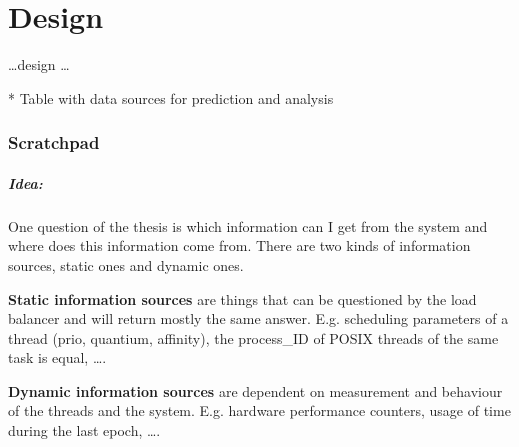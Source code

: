 \chapter{Design}
\label{sec:design}



\ldots design \ldots




* Table with data sources for prediction and analysis


\subsection{Scratchpad}
\paragraph{Idea:}
One question of the thesis is which information can I get
from the system and where does this information come from.
There are two kinds of information sources, static ones and dynamic ones.

\textbf{Static information sources} are things that can be questioned by the load
balancer and will return mostly the same answer.
E.g. scheduling parameters of a thread (prio, quantium, affinity),
the process\_ID of POSIX threads of the same task is equal,
\ldots{}.

\textbf{Dynamic information sources} are dependent on measurement and behaviour of the
threads and the system.
E.g. hardware performance counters,
usage of time during the last epoch,
\ldots{}.

